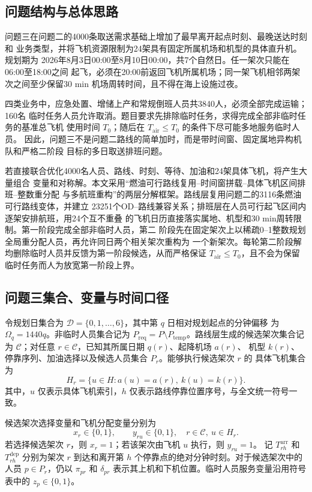 \documentclass[UTF8,a4paper,zihao=5]{ctexart}
\begin{document}
\subsection{问题结构与总体思路}

问题三在问题二的4000条取送需求基础上增加了最早离开起点时刻、最晚送达时刻和
业务类型，并将飞机资源限制为24架具有固定所属机场和机型的具体直升机。规划期为
2026年8月3日00:00至8月10日00:00，共7个自然日。任一架次只能在06:00至18:00之间
起飞，必须在20:00前返回飞机所属机场；同一架飞机相邻两架次之间至少保留30 min
机场周转时间，且不得在海上设施过夜。

四类业务中，应急处置、增储上产和常规倒班人员共3840人，必须全部完成运输；160名
临时任务人员允许取消。题目要求先排除临时任务，求得完成全部非临时任务的基准总飞机
使用时间 $T_0$；随后在 $T_{\mathrm{air}}\le T_0$ 的条件下尽可能多地服务临时人员。
因此，问题三不是问题二路线的简单加时，而是带时间窗、固定属地异构机队和严格二阶段
目标的多日取送排班问题。

若直接联合优化4000名人员、路线、时刻、等待、加油和24架具体飞机，将产生大量组合
变量和对称解。本文采用“燃油可行路线复用--时间窗拼载--具体飞机区间排班--整数重分配
与多航班重构”的两层分解框架。路线层复用问题二的3116条燃油可行路线变体，并建立
23251个OD--路线兼容关系；排班层在人员可行起飞区间内逐架安排航班，用24个互不重叠
的飞机日历直接落实属地、机型和30 min周转限制。第一阶段完成全部非临时人员，第二
阶段先在固定架次上以稀疏0--1整数规划全局重分配人员，再允许同日两个相关架次重构为
一个新架次。每轮第二阶段解均删除临时人员并反馈为第一阶段候选，从而严格保证
$T_{\mathrm{air}}\le T_0$，且不会为保留临时任务而人为放宽第一阶段上界。

\subsection{问题三集合、变量与时间口径}

令规划日集合为 $\mathcal{D}=\{0,1,\ldots,6\}$，其中第 $q$ 日相对规划起点的分钟偏移
为 $\Omega_q=1440q$。非临时人员集合记为
$P_{\mathrm{req}}=P\setminus P_{\mathrm{temp}}$。路线层生成的候选架次集合记为
$\mathcal{C}$；对任意 $r\in\mathcal{C}$，已知其所属日期 $q(r)$、起降机场 $a(r)$、
机型 $k(r)$、停靠序列、加油选择以及候选人员集合 $P_r$。能够执行候选架次 $r$ 的
具体飞机集合为
\begin{equation}
  H_r=\{u\in H:a(u)=a(r),\ k(u)=k(r)\}.
  \label{eq:q3-compatible-aircraft}
\end{equation}
其中，$u$ 仅表示具体飞机索引，$h$ 仅表示路线停靠位置序号，与全文统一符号一致。

候选架次选择变量和飞机分配变量分别为
\begin{equation}
  x_r\in\{0,1\},\qquad y_{ru}\in\{0,1\},
  \quad r\in\mathcal{C},\ u\in H_r.
  \label{eq:q3-selection-variables}
\end{equation}
若选择候选架次 $r$，则 $x_r=1$；若该架次由飞机 $u$ 执行，则 $y_{ru}=1$。
记 $T_{rh}^{\mathrm{arr}}$ 和 $T_{rh}^{\mathrm{dep}}$ 分别为架次 $r$ 到达和离开第
$h$ 个停靠点的绝对分钟时刻。对于候选架次中的人员 $p\in P_r$，仍以
$\pi_{pr}$ 和 $\delta_{pr}$ 表示其上机和下机位置。临时人员服务变量沿用符号表中的
$z_p\in\{0,1\}$。
\end{document}
